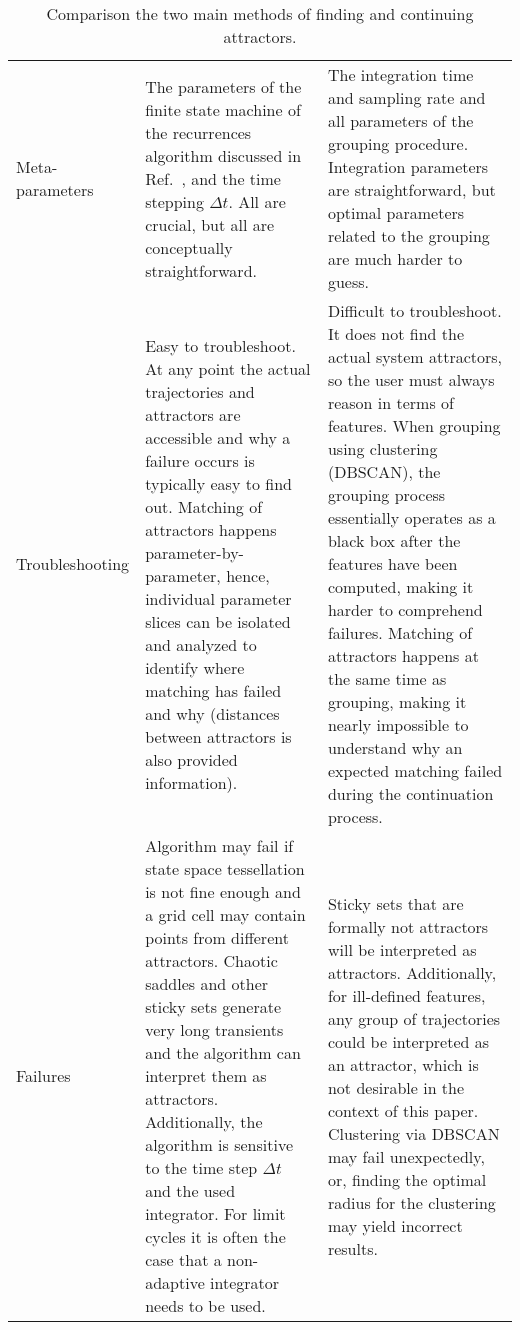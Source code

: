 \documentclass[9pt,twocolumn,twoside,lineno]{pnas-new}
\begin{document}
\begin{table*}[!t]
\begin{tabular}{p{1.5cm}p{7.5cm}p{7.5cm}}
     Meta-parameters & The parameters of the finite state machine of the recurrences algorithm discussed in Ref.~\cite{DatserisWagemakers2022}, and the time stepping $\Delta t$. All are crucial, but all are conceptually straightforward. & The integration time and sampling rate and all parameters of the grouping procedure. Integration parameters are straightforward, but optimal parameters related to the grouping are much harder to guess.\\
     
     Troubleshooting & Easy to troubleshoot. At any point the actual trajectories and attractors are accessible and why a failure occurs is typically easy to find out. Matching of attractors happens parameter-by-parameter, hence, individual parameter slices can be isolated and analyzed to identify where matching has failed and why (distances between attractors is also provided information). & Difficult to troubleshoot. It does not find the actual system attractors, so the user must always reason in terms of features. When grouping using clustering (DBSCAN), the grouping process essentially operates as a black box after the features have been computed, making it harder to comprehend failures. Matching of attractors happens at the same time as grouping, making it nearly impossible to understand why an expected matching failed during the continuation process. \\
     
     Failures & Algorithm may fail if state space tessellation is not fine enough and a grid cell may contain points from different attractors. Chaotic saddles and other sticky sets generate very long transients \cite{lai2009transient} and the algorithm can interpret them as attractors. Additionally, the algorithm is sensitive to the time step $\Delta t$ and the used integrator. For limit cycles it is often the case that a non-adaptive integrator needs to be used. & Sticky sets that are formally not attractors will be interpreted as attractors. Additionally, for ill-defined features, any group of trajectories could be interpreted as an attractor, which is not desirable in the context of this paper. Clustering via DBSCAN may fail unexpectedly, or, finding the optimal radius for the clustering may yield incorrect results. \\
     \bottomrule 
     \end{tabular}
     \caption{Comparison the two main methods of finding and continuing attractors.}
     \label{tab:comparison_attractors}
 \end{table*}
\end{document}
